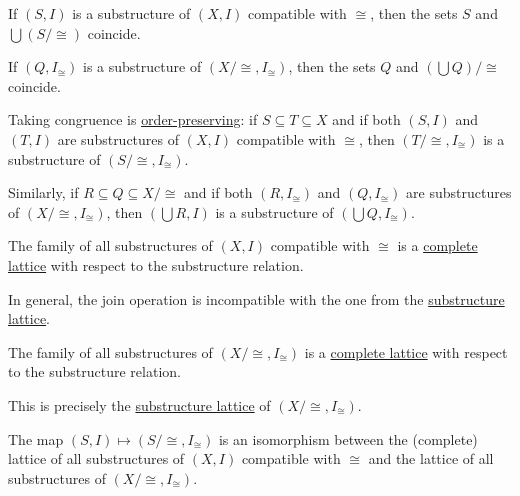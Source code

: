 \begin{theorem}
\begin{thmenum}
     If \( (S, I) \) is a substructure of \( (X, I) \) compatible with \( {\cong} \), then the sets \( S \) and \( \bigcup (S / {\cong}) \) coincide.

     If \( (Q, I_\cong) \) is a substructure of \( (X / {\cong}, I_\cong) \), then the sets \( Q \) and \( (\bigcup Q) / {\cong} \) coincide.

     Taking congruence is \hyperref[def:order_homomorphism/increasing]{order-preserving}: if \( S \subseteq T \subseteq X \) and if both \( (S, I) \) and \( (T, I) \) are substructures of \( (X, I) \) compatible with \( {\cong} \), then \( (T / {\cong}, I_\cong) \) is a substructure of \( (S / {\cong}, I_\cong) \).

     Similarly, if \( R \subseteq Q \subseteq X / {\cong} \) and if both \( (R, I_\cong) \) and \( (Q, I_\cong) \) are substructures of \( (X / {\cong}, I_\cong) \), then \( (\bigcup R, I) \) is a substructure of \( (\bigcup Q, I_\cong) \).

     The family of all substructures of \( (X, I) \) compatible with \( {\cong} \) is a \hyperref[def:semilattice/lattice]{complete lattice} with respect to the substructure relation.

    In general, the join operation is incompatible with the one from the \hyperref[thm:substructures_form_complete_lattice]{substructure lattice}.

     The family of all substructures of \( (X / {\cong}, I_\cong) \) is a \hyperref[def:semilattice/lattice]{complete lattice} with respect to the substructure relation.

    This is precisely the \hyperref[thm:substructures_form_complete_lattice]{substructure lattice} of \( (X / {\cong}, I_\cong) \).

     The map \( (S, I) \mapsto (S / {\cong}, I_\cong) \) is an isomorphism between the (complete) lattice of all substructures of \( (X, I) \) compatible with \( {\cong} \) and the lattice of all substructures of \( (X / {\cong}, I_\cong) \).
  \end{thmenum}
\end{theorem}

